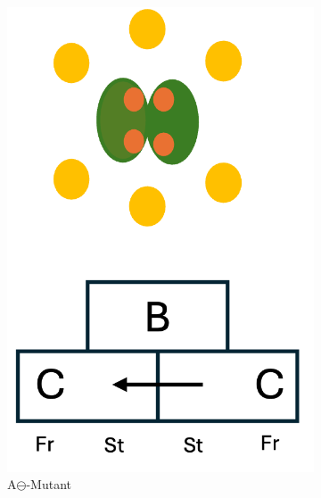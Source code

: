 \documentclass[10pt,a4paper]{article}
\begin{document}
		\begin{figure}[H]
			\centering
			\begin{subfigure}[b]{0.25\textwidth}
				\includegraphics[width=\textwidth]{A-Typ_diagramm.png}
				\caption{A$\ominus$-Mutant}
				\label{fig:A-Mutant}
			\end{subfigure}
			\hfill
			\begin{subfigure}[b]{0.3\textwidth}

\end{subfigure}
\end{figure}
\end{document}
